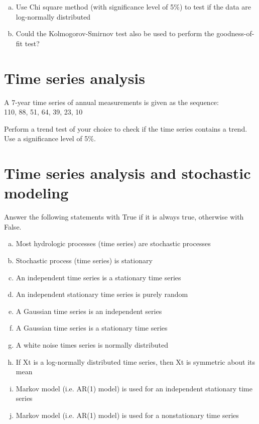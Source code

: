 \documentclass[12pt]{article}
\begin{document}
\begin{enumerate}[(a)] 
\item Use Chi square method (with significance level of 5\%) to test if the data are log-normally distributed
\item Could the Kolmogorov-Smirnov test also be used to perform the goodness-of-fit test?
\end{enumerate}


\section{Time series analysis}
A 7-year time series of annual measurements is given as the sequence:\\
110, 88, 51, 64, 39, 23, 10

Perform a trend test of your choice to check if the time series contains a trend. Use a significance level of 5\%.



\section{Time series analysis and stochastic modeling}
Answer the following statements with True if it is always true, otherwise with False.
\begin{enumerate}[(a)] 
\item Most hydrologic processes (time series) are stochastic processes
\item Stochastic process (time series) is stationary 
\item An independent time series is a stationary time series 
\item An independent stationary time series is purely random
\item A Gaussian time series is an independent series
\item A Gaussian time series is a stationary time series
\item A white noise times series is normally distributed
\item If Xt is a log-normally distributed time series, then Xt is symmetric about its mean
\item Markov model (i.e. AR(1) model) is used for an independent stationary time series
\item Markov model (i.e. AR(1) model) is used for a nonstationary time series
\end{enumerate}

\pagebreak


\end{document}
